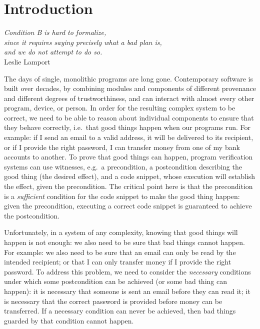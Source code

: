 \section{Introduction}


\begin{flushright}
  \textit{Condition B is hard to formalize, \\since it requires saying precisely what a bad
plan is,\\ and we do not attempt to do so.}\\
  Leslie Lamport
\end{flushright}

The days of single, monolithic programs are long gone.  Contemporary
software is built over decades, by combining modules and components of
different provenance and different degrees of trustworthiness, and can
interact with almost every other program, device, or person.
In order for the resulting complex system to be correct, we need to be
able to reason about individual components to ensure that they behave
correctly, i.e.\ that good things happen when our programs run.
For example: if I send an email to a valid address, it will be
delivered to its recipient, or if I provide the right password, I can
transfer money from one of my bank accounts to another. 
To prove that good things can
happen, program verification systems can use witnesses, e.g.\ a
precondition, a postcondition describing the good thing (the desired
effect), and a code snippet, whose execution will establish the
effect, given the precondition.  The critical point here is that the
precondition is a \emph{sufficient} condition for the code snippet to
make the good thing happen: given the precondition, executing a
correct code snippet is guaranteed to achieve the postcondition.

Unfortunately, in a system of any complexity, knowing that good things
will happen is not enough: we also need to be sure that bad things
cannot happen. For example: we also need to be sure that an email can
only be read by the intended recipient; or that I can only transfer
money if I provide the right password. To address this problem,
we need to consider the \emph{necessary} conditions under which some
postcondition can be achieved (or some bad thing can happen):
it is necessary that someone is sent an email before they can read it;
it is necessary that the correct password is provided before money can
be transferred.  If a necessary condition can never be achieved, then
bad things guarded by that condition cannot happen.

